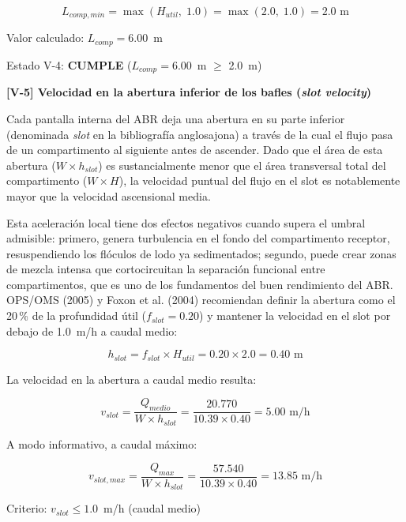\documentclass[12pt,a4paper]{article}
\begin{document}
\begin{equation}
L_{comp,min} = \max\!\left(H_{util},\; 1.0\right) = \max\!\left(2.0,\; 1.0\right) = 2.0 \text{ m}
\end{equation}

Valor calculado: $L_{comp} = 6.00$~m

Estado V-4: \textbf{CUMPLE} ($L_{comp} = 6.00$~m $\geq$ 2.0~m)

\textbf{[V-5] Velocidad en la abertura inferior de los bafles (\textit{slot velocity})}

Cada pantalla interna del ABR deja una abertura en su parte inferior (denominada \textit{slot} en la bibliografía anglosajona) a través de la cual el flujo pasa de un compartimento al siguiente antes de ascender. Dado que el área de esta abertura ($W \times h_{slot}$) es sustancialmente menor que el área transversal total del compartimento ($W \times H$), la velocidad puntual del flujo en el slot es notablemente mayor que la velocidad ascensional media.

Esta aceleración local tiene dos efectos negativos cuando supera el umbral admisible: primero, genera turbulencia en el fondo del compartimento receptor, resuspendiendo los flóculos de lodo ya sedimentados; segundo, puede crear zonas de mezcla intensa que cortocircuitan la separación funcional entre compartimentos, que es uno de los fundamentos del buen rendimiento del ABR. OPS/OMS (2005) y Foxon et al. (2004) recomiendan definir la abertura como el 20\,\% de la profundidad útil ($f_{slot} = 0.20$) y mantener la velocidad en el slot por debajo de 1.0~m/h a caudal medio:

\begin{equation}
h_{slot} = f_{slot} \times H_{util} = 0.20 \times 2.0 = 0.40 \text{ m}
\end{equation}

La velocidad en la abertura a caudal medio resulta:

\begin{equation}
v_{slot} = \frac{Q_{medio}}{W \times h_{slot}} = \frac{20.770}{10.39 \times 0.40} = 5.00 \text{ m/h}
\end{equation}

A modo informativo, a caudal máximo:

\begin{equation}
v_{slot,max} = \frac{Q_{max}}{W \times h_{slot}} = \frac{57.540}{10.39 \times 0.40} = 13.85 \text{ m/h}
\end{equation}

Criterio: $v_{slot} \leq 1.0$~m/h (caudal medio)
\end{document}
